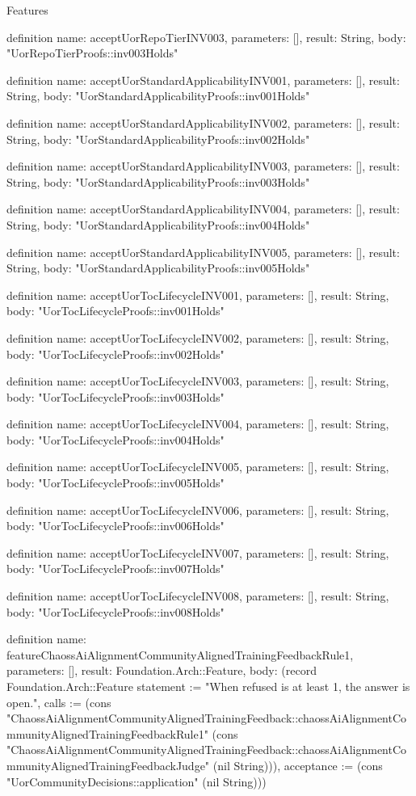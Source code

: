 \begin{lexlean}{Features}
\begin{semanticmodule}
definition{
  name: acceptUorRepoTierINV003,
  parameters: [],
  result: String,
  body: "UorRepoTierProofs::inv003Holds"
}

definition{
  name: acceptUorStandardApplicabilityINV001,
  parameters: [],
  result: String,
  body: "UorStandardApplicabilityProofs::inv001Holds"
}

definition{
  name: acceptUorStandardApplicabilityINV002,
  parameters: [],
  result: String,
  body: "UorStandardApplicabilityProofs::inv002Holds"
}

definition{
  name: acceptUorStandardApplicabilityINV003,
  parameters: [],
  result: String,
  body: "UorStandardApplicabilityProofs::inv003Holds"
}

definition{
  name: acceptUorStandardApplicabilityINV004,
  parameters: [],
  result: String,
  body: "UorStandardApplicabilityProofs::inv004Holds"
}

definition{
  name: acceptUorStandardApplicabilityINV005,
  parameters: [],
  result: String,
  body: "UorStandardApplicabilityProofs::inv005Holds"
}

definition{
  name: acceptUorTocLifecycleINV001,
  parameters: [],
  result: String,
  body: "UorTocLifecycleProofs::inv001Holds"
}

definition{
  name: acceptUorTocLifecycleINV002,
  parameters: [],
  result: String,
  body: "UorTocLifecycleProofs::inv002Holds"
}

definition{
  name: acceptUorTocLifecycleINV003,
  parameters: [],
  result: String,
  body: "UorTocLifecycleProofs::inv003Holds"
}

definition{
  name: acceptUorTocLifecycleINV004,
  parameters: [],
  result: String,
  body: "UorTocLifecycleProofs::inv004Holds"
}

definition{
  name: acceptUorTocLifecycleINV005,
  parameters: [],
  result: String,
  body: "UorTocLifecycleProofs::inv005Holds"
}

definition{
  name: acceptUorTocLifecycleINV006,
  parameters: [],
  result: String,
  body: "UorTocLifecycleProofs::inv006Holds"
}

definition{
  name: acceptUorTocLifecycleINV007,
  parameters: [],
  result: String,
  body: "UorTocLifecycleProofs::inv007Holds"
}

definition{
  name: acceptUorTocLifecycleINV008,
  parameters: [],
  result: String,
  body: "UorTocLifecycleProofs::inv008Holds"
}

definition{
  name: featureChaossAiAlignmentCommunityAlignedTrainingFeedbackRule1,
  parameters: [],
  result: Foundation.Arch::Feature,
  body: (record Foundation.Arch::Feature {statement := "When refused is at least 1, the answer is open.", calls := (cons "ChaossAiAlignmentCommunityAlignedTrainingFeedback::chaossAiAlignmentCommunityAlignedTrainingFeedbackRule1" (cons "ChaossAiAlignmentCommunityAlignedTrainingFeedback::chaossAiAlignmentCommunityAlignedTrainingFeedbackJudge" (nil String))), acceptance := (cons "UorCommunityDecisions::application" (nil String))})
}


\end{semanticmodule}
\end{lexlean}
